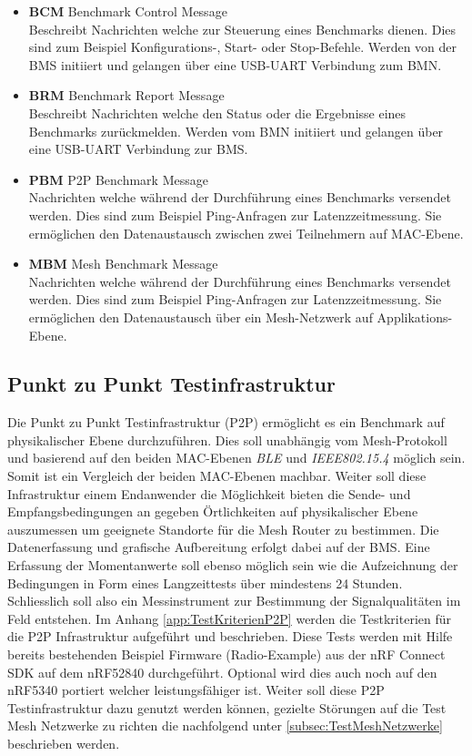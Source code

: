 \begin{itemize}
	\item \textbf{BCM} Benchmark Control Message \\ 
	Beschreibt Nachrichten welche zur Steuerung eines Benchmarks dienen. Dies sind zum Beispiel Konfigurations-, Start- oder Stop-Befehle. Werden von der BMS initiiert und gelangen über eine USB-UART Verbindung zum BMN. 
	\item \textbf{BRM} Benchmark Report Message \\ 
	Beschreibt Nachrichten welche den Status oder die Ergebnisse eines Benchmarks zurückmelden. Werden vom BMN initiiert und gelangen über eine USB-UART Verbindung zur BMS.
	\item \textbf{PBM} P2P Benchmark Message \\ 
	Nachrichten welche während der Durchführung eines Benchmarks versendet werden. Dies sind zum Beispiel Ping-Anfragen zur Latenzzeitmessung. Sie ermöglichen den Datenaustausch zwischen zwei Teilnehmern auf MAC-Ebene. 
	\item \textbf{MBM} Mesh Benchmark Message \\ 
	Nachrichten welche während der Durchführung eines Benchmarks versendet werden. Dies sind zum Beispiel Ping-Anfragen zur Latenzzeitmessung. Sie ermöglichen den Datenaustausch über ein Mesh-Netzwerk auf Applikations-Ebene. 
\end{itemize}

\subsection{Punkt zu Punkt Testinfrastruktur}\label{subsec:PunktzuPunktTestinfrastruktur}

Die Punkt zu Punkt Testinfrastruktur (P2P) ermöglicht es ein Benchmark auf physikalischer Ebene durchzuführen. Dies soll unabhängig vom Mesh-Protokoll und basierend auf den beiden MAC-Ebenen \textit{BLE} und \textit{IEEE802.15.4} möglich sein. Somit ist ein Vergleich der beiden MAC-Ebenen machbar. Weiter soll diese Infrastruktur einem Endanwender die Möglichkeit bieten die Sende- und Empfangsbedingungen an gegeben Örtlichkeiten auf physikalischer Ebene auszumessen um geeignete Standorte für die Mesh Router zu bestimmen. Die Datenerfassung und grafische Aufbereitung erfolgt dabei auf der BMS. Eine Erfassung der Momentanwerte soll ebenso möglich sein wie die Aufzeichnung der Bedingungen in Form eines Langzeittests über mindestens 24 Stunden.
Schliesslich soll also ein Messinstrument zur Bestimmung der Signalqualitäten im Feld entstehen.
Im Anhang \ref{app:TestKriterienP2P} werden die Testkriterien für die P2P Infrastruktur aufgeführt und beschrieben. Diese Tests werden mit Hilfe bereits bestehenden Beispiel Firmware (Radio-Example) aus der nRF Connect SDK auf dem nRF52840 durchgeführt. Optional wird dies auch noch auf den nRF5340 portiert welcher leistungsfähiger ist.
Weiter soll diese P2P Testinfrastruktur dazu genutzt werden können, gezielte Störungen auf die Test Mesh Netzwerke zu richten die nachfolgend unter \ref{subsec:TestMeshNetzwerke} beschrieben werden.


